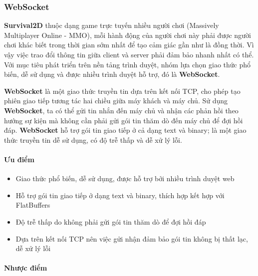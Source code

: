 \documentclass[12pt,a4paper]{article}
\begin{document}
  
  \subsubsection{WebSocket}
  \textbf{Survival2D} thuộc dạng game trực tuyến nhiều người chơi (Massively Multiplayer Online - MMO), mỗi hành động của người chơi này phải được người chơi khác biết trong thời gian sớm nhất để tạo cảm giác gần như là đồng thời. Vì vậy việc trao đổi thông tin giữa client và server phải đảm bảo nhanh nhất có thể. Với mục tiêu phát triển trên nền tảng trình duyệt, nhóm lựa chọn giao thức phổ biến, dễ sử dụng và được nhiều trình duyệt hỗ trợ, đó là \textbf{WebSocket}.
  
  \textbf{WebSocket} là một giao thức truyền tin dựa trên kết nối TCP, cho phép tạo phiên giao tiếp tương tác hai chiều giữa máy khách và máy chủ. Sử dụng \textbf{WebSocket}, ta có thể gửi tin nhắn đến máy chủ và nhận các phản hồi theo hướng sự kiện mà không cần phải gửi gói tin thăm dò đến máy chủ để đợi hồi đáp. \textbf{WebSocket} hỗ trợ gói tin giao tiếp ở cả dạng text và binary; là một giao thức truyền tin dễ sử dụng, có độ trễ thấp và dễ xử lý lỗi.

  \paragraph{Ưu điểm}\mbox{}
  
  \begin{itemize}
      \item Giao thức phổ biến, dễ sử dụng, được hỗ trợ bởi nhiều trình duyệt web
      \item Hỗ trợ gói tin giao tiếp ở dạng text và binary, thích hợp kết hợp với FlatBuffers
      \item Độ trễ thấp do không phải gửi gói tin thăm dò để đợi hồi đáp
      \item Dựa trên kết nối TCP nên việc gửi nhận đảm bảo gói tin không bị thất lạc, dễ xử lý lỗi
  \end{itemize}

  \paragraph{Nhược điểm}\mbox{}
  
\end{document}
